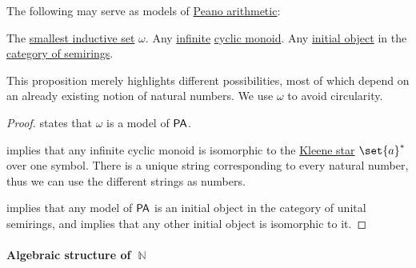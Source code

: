 \begin{proposition}\label{thm:peano_arithmetic_models}
  The following may serve as models of \hyperref[def:peano_arithmetic]{Peano arithmetic}:
  \begin{itemize}
     The \hyperref[thm:smallest_inductive_set_existence]{smallest inductive set} \( \omega \).
     Any \hyperref[def:set_finiteness]{infinite} \hyperref[def:cyclic_monoid]{cyclic monoid}.
     Any \hyperref[def:universal_objects/initial]{initial object} in the \hyperref[def:semiring/category]{category of semirings}.
  \end{itemize}
\end{proposition}
\begin{comments}
  \item This proposition merely highlights different possibilities, most of which depend on an already existing notion of natural numbers. We use \( \omega \) to avoid circularity.
\end{comments}
\begin{proof}
    states that \( \omega \) is a model of \( \textsf{PA} \).

    implies that any infinite cyclic monoid is isomorphic to the \hyperref[def:formal_language/kleene_star]{Kleene star} \( \set{ a }^* \) over one symbol. There is a unique string corresponding to every natural number, thus we can use the different strings as numbers.

    implies that any model of \( \textsf{PA} \) is an initial object in the category of unital semirings, and  implies that any other initial object is isomorphic to it.
\end{proof}

\paragraph{Algebraic structure of \( \BbbN \)}


